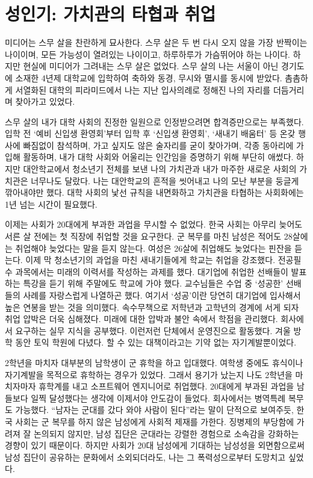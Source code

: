 \section*{성인기: 가치관의 타협과 취업}

미디어는 스무 살을 찬란하게 묘사한다. 스무 살은 두 번 다시 오지 않을 가장 반짝이는 나이이며, 모든 가능성이 열려있는 나이이고, 하루하루가 가슴뛰어야 하는 나이다. 하지만 현실에 미디어가 그려내는 스무 살은 없었다. 스무 살의 나는 서울이 아닌 경기도에 소재한 4년제 대학교에 입학하여 축하와 동경, 무시와 멸시를 동시에 받았다. 촘촘하게 서열화된 대학의 피라미드에서 나는 지난 입사의례로 정해진 나의 자리를 더듬거리며 찾아가고 있었다.

스무 살의 내가 대학 사회의 진정한 일원으로 인정받으려면 합격증만으로는 부족했다. 입학 전 `예비 신입생 환영회'부터 입학 후 `신입생 환영회', `새내기 배움터' 등 온갖 행사에 빠짐없이 참석하며, 가고 싶지도 않은 술자리를 굳이 찾아가며, 각종 동아리에 가입해 활동하며, 내가 대학 사회와 어울리는 인간임을 증명하기 위해 부단히 애썼다. 하지만 대안학교에서 청소년기 전체를 보낸 나의 가치관과 내가 마주한 새로운 사회의 가치관은 너무나도 달랐다. 나는 대안학교의 흔적을 씻어내고 나의 모난 부분을 둥글게 깎아내야만 했다. 대학 사회의 낯선 규칙을 내면화하고 가치관을 타협하는 사회화에는 1년 넘는 시간이 필요했다.

이제는 사회가 20대에게 부과한 과업을 무시할 수 없었다. 한국 사회는 아무리 늦어도 서른 살 전에는 첫 직장에 취업할 것을 요구한다. 군 복무를 마친 남성은 적어도 28살에는 취업해야 늦었다는 말을 듣지 않는다. 여성은 26살에 취업해도 늦었다는 핀잔을 듣는다. 이제 막 청소년기의 과업을 마친 새내기들에게 학교는 취업을 강조했다. 전공필수 과목에서는 미래의 이력서를 작성하는 과제를 했다. 대기업에 취업한 선배들이 발표하는 특강을 듣기 위해 주말에도 학교에 가야 했다. 교수님들은 수업 중 `성공한' 선배들의 사례를 자랑스럽게 나열하곤 했다. 여기서 `성공'이란 당연히 대기업에 입사해서 높은 연봉을 받는 것을 의미했다. 속수무책으로 저학년과 고학년의 경계에 서게 되자 취업 압박은 더욱 심해졌다. 미래에 대한 압박과 불안 속에서 학점을 관리했다. 회사에서 요구하는 실무 지식을 공부했다. 이런저런 단체에서 운영진으로 활동했다. 겨울 방학 동안 토익 학원에 다녔다. 할 수 있는 대책이라고는 기약 없는 자기계발뿐이었다.

2학년을 마치자 대부분의 남학생이 군 휴학을 하고 입대했다. 여학생 중에도 휴식이나 자기계발을 목적으로 휴학하는 경우가 있었다. 그래서 용기가 났는지 나도 2학년을 마치자마자 휴학계를 내고 소프트웨어 엔지니어로 취업했다. 20대에게 부과된 과업을 남들보다 일찍 달성했다는 생각에 이제서야 안도감이 들었다. 회사에서는 병역특례 복무도 가능했다. ``남자는 군대를 갔다 와야 사람이 된다''라는 말이 단적으로 보여주듯, 한국 사회는 군 복무를 하지 않은 남성에게 사회적 제재를 가한다. 징병제의 부당함에 가려져 잘 논의되지 않지만, 남성 집단은 군대라는 강렬한 경험으로 소속감을 강화하는 경향이 있기 때문이다. 하지만 사회가 20대 남성에게 기대하는 남성성을 외면함으로써 남성 집단이 공유하는 문화에서 소외되더라도, 나는 그 폭력성으로부터 도망치고 싶었다.

